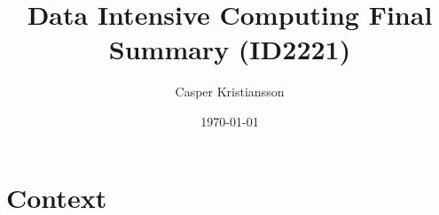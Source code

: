 \documentclass[12pt]{article}
\title{Data Intensive Computing Final Summary (ID2221)}
\author{Casper Kristiansson}
\date{\today}
\begin{document}
\maketitle

\section{Context}\label{context}

\printbibliography
\end{document}
